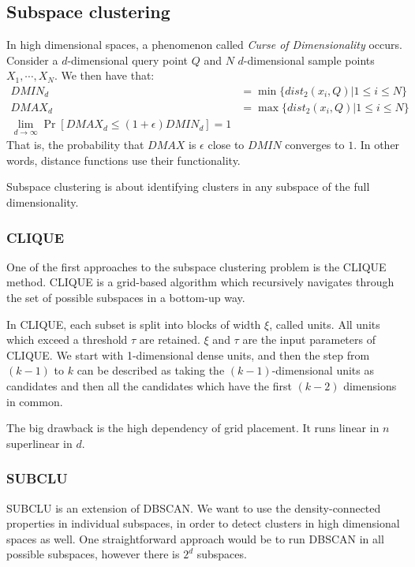     
    \subsection{Subspace clustering}
    In high dimensional spaces, a phenomenon called \textit{Curse of 
    Dimensionality} occurs. Consider a $d$-dimensional query point $Q$ and $N$ 
    $d$-dimensional sample points $X_1,\cdots,X_N$. We then have that:
    \begin{align*}
        DMIN_d&=\min\{dist_2(x_i,Q) | 1 \leq i \leq N\}\\
        DMAX_d&=\max\{dist_2(x_i,Q) | 1 \leq i \leq N\}\\
        \lim_{d\rightarrow \infty} \Pr[DMAX_d \leq (1+\epsilon)DMIN_d] = 1
    \end{align*}
    That is, the probability that $DMAX$ is $\epsilon$ close to $DMIN$ 
    converges to $1$. In other words, distance functions use their 
    functionality.
    
    Subspace clustering is about identifying clusters in any subspace of the 
    full dimensionality.
    
    \subsubsection{CLIQUE}
    One of the first approaches to the subspace clustering problem is the 
    CLIQUE method. CLIQUE is a grid-based algorithm which recursively navigates 
    through the set of possible subspaces in a bottom-up way.
    
    In CLIQUE, each subset is split into blocks of width $\xi$, called units. 
    All units which exceed a threshold $\tau$ are retained. $\xi$ and $\tau$ 
    are the input parameters of CLIQUE. We start with 1-dimensional dense 
    units, and then the step from $(k-1)$ to $k$ can be described as taking the 
    $(k-1)$-dimensional units as candidates and then all the candidates which 
    have the first $(k-2)$ dimensions in common.
    
    The big drawback is the high dependency of grid placement. It runs linear 
    in $n$ superlinear in $d$.
    
    \subsubsection{SUBCLU}
    SUBCLU is an extension of DBSCAN. We want to use the density-connected 
    properties in individual subspaces, in order to detect clusters in high 
    dimensional spaces as well. One straightforward approach would be to run 
    DBSCAN in all possible subspaces, however there is $2^d$ subspaces.
    
